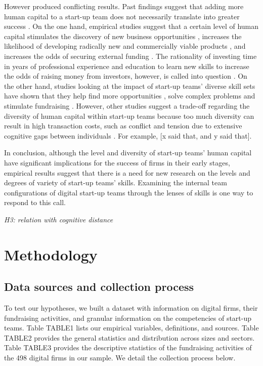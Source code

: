 \documentclass[12pt]{article}
\begin{document}
However produced conflicting results. Past findings suggest that adding more human capital to a start-up team does not necessarily translate into greater success \citep{pierce2013too}. On the one hand, empirical studies suggest that a certain level of human capital stimulates the discovery of new business opportunities \citep{shane2000promise, marvel2016human}, increases the likelihood of developing radically new and commercially viable products \citep{marvel2007technology}, and increases the odds of securing external funding \citep{beckman2007early}. The rationality of investing time in years of professional experience and education to learn new skills to increase the odds of raising money from investors, however, is called into question \citep{audretsch2004financing}. On the other hand, studies looking at the impact of start-up teams' diverse skill sets have shown that they help find more opportunities \citep{shane2000prior}, solve complex problems \citep{hong2001problem} and stimulate fundraising \citep{ko2018signaling}. However, other studies suggest a trade-off regarding the diversity of human capital within start-up teams because too much diversity can result in high transaction costs, such as conflict and tension due to extensive cognitive gaps between individuals \citep{nooteboom2007optimal}. For example, [x said that, and y said that].

In conclusion, although the level and diversity of start-up teams' human capital have significant implications for the success of firms in their early stages, empirical results suggest that there is a need for new research on the levels and degrees of variety of start-up teams' skills. Examining the internal team configurations of digital start-up teams through the lenses of skills is one way to respond to this call.

\noindent \textit{H3: relation with cognitive distance}

\section{Methodology}

\subsection{Data sources and collection process}

To test our hypotheses, we built a dataset with information on digital firms, their fundraising activities, and granular information on the competencies of start-up teams. Table TABLE1 lists our empirical variables, definitions, and sources. Table TABLE2 provides the general statistics and distribution across sizes and sectors. Table TABLE3 provides the descriptive statistics of the fundraising activities of the 498 digital firms in our sample. We detail the collection process below. \\
\end{document}
